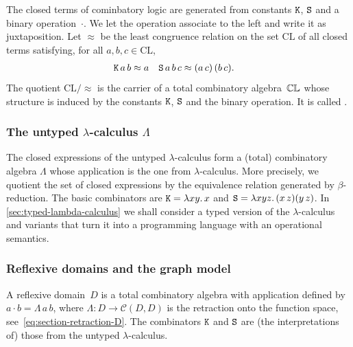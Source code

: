 The closed terms of cominbatory logic are generated from constants $\mathtt{K}$, $\mathtt{S}$ and a binary operation~$\cdot$.
We let the operation associate to the left and write it as juxtaposition.
%
Let $\approx$ be the least congruence relation
on the set $\mathrm{CL}$ of all closed terms satisfying, for all $a, b, c \in \mathrm{CL}$,
%
\begin{align*}
  \mathtt{K} \, a \, b &\approx a
  &
  \mathtt{S} \, a \, b \, c &\approx (a \, c) \, (b \, c).
\end{align*}
%
The quotient $\mathrm{CL}/{\approx}$ is the carrier of a total combinatory algebra~$\mathbb{CL}$ whose structure is induced by the constants $\mathtt{K}$, $\mathtt{S}$ and the binary operation. It is called .


\subsubsection[\texorpdfstring%
{The untyped $\lambda$-calculus $\Lambda$}%
{The untyped lambda-calculus Lambda}%
]{The untyped $\lambda$-calculus $\Lambda$}
\label{sec:lambda-calculus-pca}

The closed expressions of the untyped $\lambda$-calculus form a
(total) combinatory algebra $\Lambda$ whose application is the one from
$\lambda$-calculus. More precisely, we quotient the set of closed
expressions by the equivalence relation generated by
$\beta$-reduction. The basic combinators are $\mathtt{K} = \lambda x y .\,x$
and $\mathtt{S} = \lambda x y z .\,(x \, z)(y \, z)$.
%
In \cref{sec:typed-lambda-calculus} we shall consider a typed version of the $\lambda$-calculus and variants that turn it into a programming language with an operational semantics.


\subsubsection{Reflexive domains and the graph model}
\label{sec:reflexive-domain-pca}

A reflexive domain~$D$ is a total combinatory algebra with application defined by $a \cdot b = \Lambda \, a \, b$, where $\Lambda : D \to \mathcal{C}(D, D)$ is the
retraction onto the function space, see~\eqref{eq:section-retraction-D}. The combinators $\mathtt{K}$ and $\mathtt{S}$ are (the interpretations of) those from the untyped $\lambda$-calculus.

